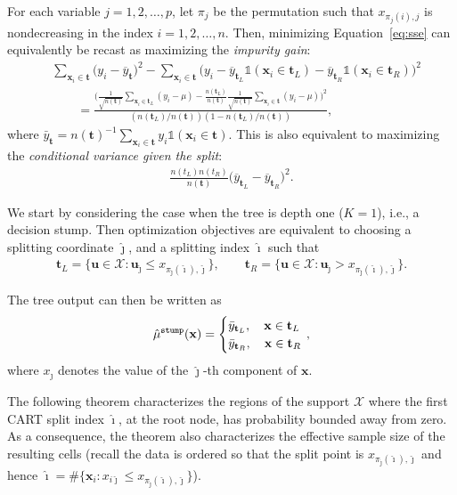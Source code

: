 \documentclass[10pt]{article}
\def\bt{\mathbf{t}}
\def\bx{\mathbf{x}}
\def\bu{\mathbf{u}}
\def\X{\mathcal{X}}
\def\mustump{\hat{\mu}^{\mathtt{stump}}}
\newcommand{\Indicator}{\mathds{1}}
\theoremstyle{definition}
\theoremstyle{remark}
\begin{document}
For each variable $ j = 1, 2, \dots, p $, let $\pi_j$ be the permutation such that $ x_{\pi_{j}(i),j} $ is nondecreasing in the index $ i = 1, 2, \dots, n$.
Then, minimizing Equation~\eqref{eq:sse} can equivalently be recast as maximizing the \emph{impurity gain}:
\begin{equation*}
\begin{aligned}
& \sum_{\bx_i \in \bt}\big(y_i-\overline y_{\bt}\big)^2 - \sum_{\bx_i \in \bt}\big(y_i - \overline y_{\bt_L} \Indicator(\bx_{i} \in \bt_L) - \overline y_{\bt_R} \Indicator(\bx_i \in \bt_R)\big)^2
 \\
 & \qquad = \frac{\Big(\frac{1}{\sqrt{n(\bt)}}\sum_{\bx_i \in \bt_L} (y_i-\mu) - \frac{n(\bt_L)}{n(\bt)}\frac{1}{\sqrt{n(\bt)}}\sum_{\bx_i \in \bt} (y_i-\mu) \Big)^2}{(n(\bt_L)/n(\bt))(1-n(\bt_L)/n(\bt))},
 \end{aligned}
\end{equation*}
where $\bar{y}_{\bt} = n(\bt)^{-1} \sum_{\bx_i \in \bt} y_i \Indicator(\bx_i \in \bt)$.
This is also equivalent to maximizing the \textit{conditional variance given the split}:
\begin{align*}
    \frac{n(t_L)n(t_R)}{n(\bt)}\big(\overline y_{\bt_L}-\overline y_{\bt_R}\big)^2.
\end{align*}

We start by considering the case when the tree is depth one ($K=1$), i.e., a decision stump. Then optimization objectives are equivalent to choosing a splitting coordinate $\hat{\jmath}$, and a splitting index $\hat{\imath}$ such that
\begin{align*}
    \bt_L = \{\bu \in \X: \bu_{\hat{\jmath}} \leq x_{\pi_{\hat{\jmath}}(\hat{\imath}), \hat{\jmath}}\}, \qquad \bt_R = \{\bu \in \X: \bu_{\hat{\jmath}} > x_{\pi_{\hat{\jmath}}(\hat{\imath}), \hat{\jmath}}\}.
\end{align*}

The tree output can then be written as
\begin{equation*}
    \mustump(\bx) = \begin{cases}
     \bar{y}_{\bt_L}, \quad \bx \in \bt_L\\
     \bar{y}_{\bt_R}, \quad \bx \in \bt_R
    \end{cases}\hspace{-3mm},
\end{equation*}
where $x_{\hat{\jmath}}$ denotes the value of the $\hat{\jmath}$-th component of $\bx$.

The following theorem characterizes the regions of the support $\mathcal{X}$ where the first CART split index $ \hat{\imath} $, at the root node, has probability bounded away from zero. As a consequence, the theorem also characterizes the effective sample size of the resulting cells (recall the data is ordered so that the split point is $x_{\pi_{\hat{\jmath}}(\hat{\imath}),\hat{\jmath}}$ and hence $ \hat{\imath} = \#\{\bx_i : x_{i\hat{\jmath}} \leq x_{\pi_{\hat{\jmath}}(\hat{\imath}),\hat{\jmath}} \} $).
\end{document}

